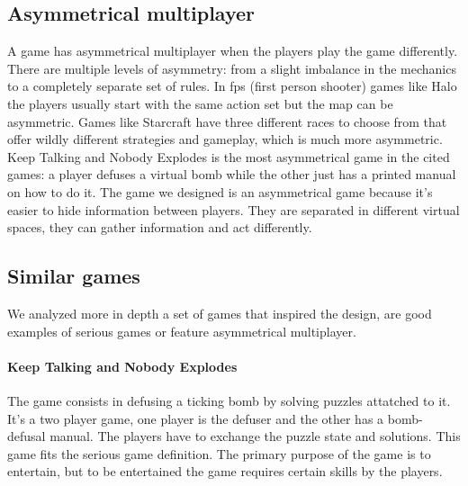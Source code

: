 \documentclass[12pt]{article}
\begin{document}
\subsection{Asymmetrical multiplayer}
A game has asymmetrical multiplayer when the players play the game differently. There are multiple levels of asymmetry: from a slight imbalance in the mechanics to a completely separate set of rules. In fps (first person shooter) games like Halo \cite{Halo} the players usually start with the same action set but the map can be asymmetric. Games like Starcraft \cite{starcraft} have three different races to choose from that offer wildly different strategies and gameplay, which is much more asymmetric. Keep Talking and Nobody Explodes is the most asymmetrical game in the cited games: a player defuses a virtual bomb while the other just has a printed manual on how to do it. The game we designed is an asymmetrical game because it's easier to hide information between players. They are separated in different virtual spaces, they can gather information and act differently.

\subsection{Similar games}
We analyzed more in depth a set of games that inspired the design, are good examples of serious games or feature asymmetrical multiplayer. 

\paragraph{Keep Talking and Nobody Explodes} \cite{ktne}
The game consists in defusing a ticking bomb by solving puzzles attatched to it. It's a two player game, one player is the defuser and the other has a bomb-defusal manual. The players have to exchange the puzzle state and solutions. This game fits the serious game definition. The primary purpose of the game is to entertain, but to be entertained the game requires certain skills by the players. 

\vspace{0.4cm}
\end{document}
